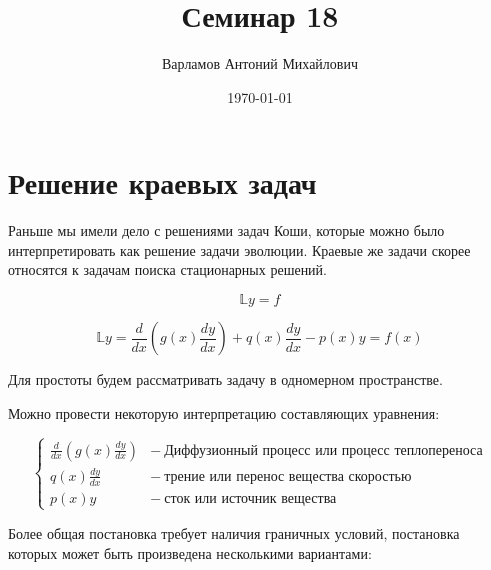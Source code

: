 \documentclass[10pt,a4paper]{article}
\title{Семинар 18}
\date{\today}
\author{Варламов Антоний Михайлович}
\begin{document}
	\maketitle
	
	\section{Решение краевых задач}
	
	Раньше мы имели дело с решениями задач Коши, которые можно было 
	интерпретировать как решение задачи эволюции. Краевые же задачи скорее 
	относятся к задачам поиска стационарных решений.
	
	\begin{equation}
		\mathbb{L}y = f
	\end{equation}
	
	\begin{equation}
		\mathbb{L}y = \frac{d}{dx}\left(g\left(x\right)\frac{dy}{dx}\right) + 
		q\left(x\right)\frac{dy}{dx} - p\left(x\right)y = f\left(x\right)
	\end{equation}
	
	Для простоты будем рассматривать задачу в одномерном пространстве.
	
	Можно провести некоторую интерпретацию составляющих уравнения:
	
	\begin{equation}
		\begin{cases}
			\frac{d}{dx}\left(g\left(x\right)\frac{dy}{dx}\right) &- \ 
			\text{Диффузионный процесс или процесс теплопереноса}
			\\
			q\left(x\right)\frac{dy}{dx} &- \ \text{трение или перенос вещества 
			скоростью}
			\\
			p\left(x\right)y &- \ \text{сток или источник вещества}
		\end{cases}
	\end{equation}
	
	Более общая постановка требует наличия граничных условий, постановка которых 
	может быть произведена несколькими вариантами:
	
\end{document}
